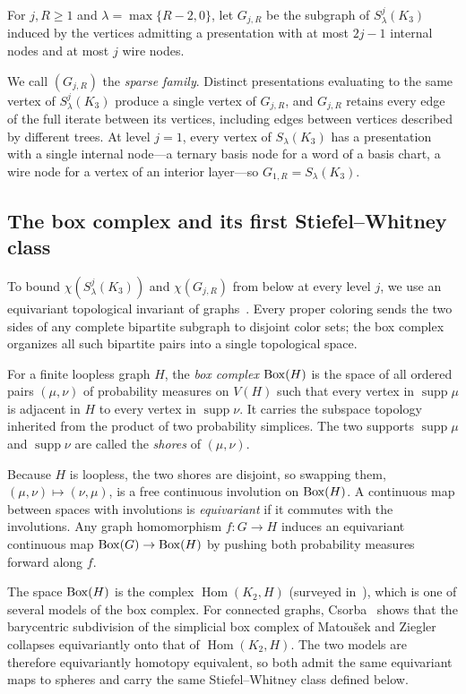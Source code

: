 \begin{definition}\label{def:sparse-graph}
For $j,R\ge1$ and $\lambda=\max\{R-2,0\}$, let $G_{j,R}$ be the subgraph of $S^j_\lambda(K_3)$ induced by the vertices admitting a presentation with at most $2j-1$ internal nodes and at most $j$ wire nodes.
\end{definition}

We call $(G_{j,R})$ the \emph{sparse family}. Distinct presentations evaluating to the same vertex of $S^j_\lambda(K_3)$ produce a single vertex of $G_{j,R}$, and $G_{j,R}$ retains every edge of the full iterate between its vertices, including edges between vertices described by different trees. At level $j=1$, every vertex of $S_\lambda(K_3)$ has a presentation with a single internal node---a ternary basis node for a word of a basis chart, a wire node for a vertex of an interior layer---so $G_{1,R}=S_\lambda(K_3)$.

\subsection{The box complex and its first Stiefel--Whitney class}\label{sec:box}

To bound $\chi(S^j_\lambda(K_3))$ and $\chi(G_{j,R})$ from below at every level $j$, we use an equivariant topological invariant of graphs~\cite{Mat,Kozlov}. Every proper coloring sends the two sides of any complete bipartite subgraph to disjoint color sets; the box complex organizes all such bipartite pairs into a single topological space.

For a finite loopless graph $H$, the \emph{box complex} $\operatorname{Box}(H)$ is the space of all ordered pairs $(\mu,\nu)$ of probability measures on $V(H)$ such that every vertex in $\operatorname{supp}\mu$ is adjacent in $H$ to every vertex in $\operatorname{supp}\nu$. It carries the subspace topology inherited from the product of two probability simplices. The two supports $\operatorname{supp}\mu$ and $\operatorname{supp}\nu$ are called the \emph{shores} of $(\mu,\nu)$.

Because $H$ is loopless, the two shores are disjoint, so swapping them, $(\mu,\nu)\mapsto(\nu,\mu)$, is a free continuous involution on $\operatorname{Box}(H)$. A continuous map between spaces with involutions is \emph{equivariant} if it commutes with the involutions. Any graph homomorphism $f:G\to H$ induces an equivariant continuous map $\operatorname{Box}(G)\to\operatorname{Box}(H)$ by pushing both probability measures forward along $f$.

The space $\operatorname{Box}(H)$ is the complex $\operatorname{Hom}(K_2,H)$ (surveyed in~\cite{Kozlov}), which is one of several models of the box complex. For connected graphs, Csorba~\cite[Theorem~9]{Csorba} shows that the barycentric subdivision of the simplicial box complex of Matou{\v s}ek and Ziegler~\cite{MZ} collapses equivariantly onto that of $\operatorname{Hom}(K_2,H)$. The two models are therefore equivariantly homotopy equivalent, so both admit the same equivariant maps to spheres and carry the same Stiefel--Whitney class defined below.

